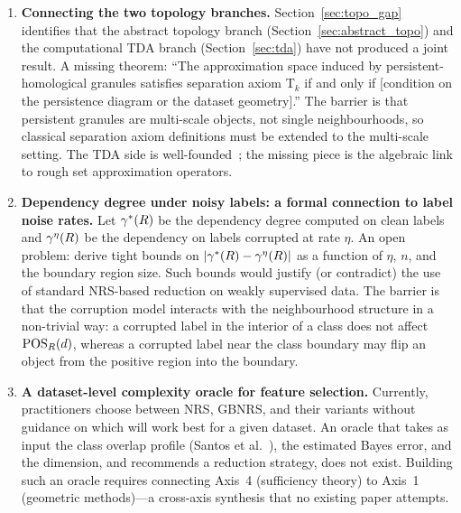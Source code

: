 \begin{enumerate}
\item \textbf{Connecting the two topology branches.}
Section~\ref{sec:topo_gap} identifies that the abstract topology branch
(Section~\ref{sec:abstract_topo}) and the computational TDA branch
(Section~\ref{sec:tda}) have not produced a joint result.  A missing theorem:
``The approximation space induced by persistent-homological granules satisfies
separation axiom T$_k$ if and only if [condition on the persistence diagram
or the dataset geometry].''  The barrier is that persistent granules are
multi-scale objects, not single neighbourhoods, so classical separation axiom
definitions must be extended to the multi-scale setting.
The TDA side is well-founded~\cite{Carlsson2009topology,ChazalMichel2021TDA};
the missing piece is the algebraic link to rough set approximation operators.

\item \textbf{Dependency degree under noisy labels: a formal connection to
    label noise rates.}
Let $\gamma^*(R)$ be the dependency degree computed on clean labels and
$\gamma^\eta(R)$ be the dependency on labels corrupted at rate $\eta$.
An open problem: derive tight bounds on $|\gamma^*(R) - \gamma^\eta(R)|$ as a
function of $\eta$, $n$, and the boundary region size.  Such bounds would
justify (or contradict) the use of standard NRS-based reduction on weakly
supervised data.  The barrier is that the corruption model interacts with
the neighbourhood structure in a non-trivial way: a corrupted label in the
interior of a class does not affect $\mathrm{POS}_R(d)$, whereas a corrupted label
near the class boundary may flip an object from the positive region into the
boundary.

\item \textbf{A dataset-level complexity oracle for feature selection.}
Currently, practitioners choose between NRS, GBNRS, and their variants
without guidance on which will work best for a given dataset.  An oracle
that takes as input the class overlap profile (Santos et al.~\cite{Santos2022overlap}),
the estimated Bayes error, and the dimension, and recommends a reduction
strategy, does not exist.  Building such an oracle requires connecting
Axis~4 (sufficiency theory) to Axis~1 (geometric methods)---a cross-axis
synthesis that no existing paper attempts.


\end{enumerate}

